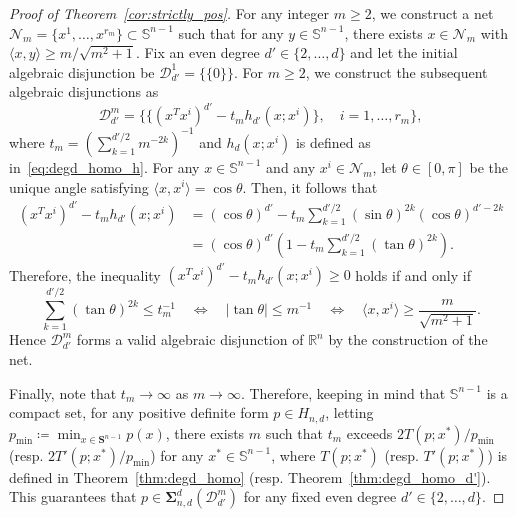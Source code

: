 \documentclass[12pt]{article}
\newcommand{\reals}{\mathbb{R}}
\newcommand{\DiSOS}{\mathbf{\Sigma}}
\newcommand{\defeq}{\coloneq}
\newcommand{\mcN}{\mathcal{N}}
\newcommand{\mbS}{\mathbb{S}}
\newcommand{\mcD}{\mathcal{D}}
\theoremstyle{remark}
\begin{document}
\begin{proof}[Proof of Theorem~\ref{cor:strictly_pos}]
For any integer $m\ge 2$, we
construct a net $\mcN_m=\{x^1,\ldots,x^{r_m}\}\subset\mbS^{n-1}$ such that for any $y\in \mbS^{n-1}$, there exists $x\in \mcN_m$ with $\langle x,y\rangle\ge m/\sqrt{m^2+1}$. 
Fix an even degree $d'\in\{2,\ldots,d\}$ and let the initial algebraic disjunction be $\mcD_{d'}^1=\{\{0\}\}$. For $m\ge 2$, we construct the subsequent algebraic disjunctions as 
\begin{equation}\label{eq:strictly_pos_ad}
 \mcD^{m}_{d'}=\big\{\{(x^Tx^i)^{d'}-t_mh_{d'}(x;x^i)\},\quad i=1,\ldots,r_m\big\},
\end{equation}
where $t_m=\left(\sum_{k=1}^{d'/2}m^{-2k}\right)^{-1}$ and $h_{d}(x;x^i)$ is defined as in~\eqref{eq:degd_homo_h}. 
For any $x\in\mbS^{n-1}$ and any $x^i\in\mcN_m$, let $\theta\in[0,\pi]$ be the unique angle satisfying $\langle x,x^i\rangle=\cos\theta$. Then, it follows that
\[\begin{aligned}
    (x^Tx^i)^{d'}-t_mh_{d'}(x;x^i)&=(\cos\theta)^{d'}-t_m\sum_{k=1}^{d'/2}(\sin\theta)^{2k}(\cos\theta)^{d'-2k}\\
    &=(\cos\theta)^{d'}\left(1-t_m\sum_{k=1}^{d'/2}(\tan\theta)^{2k}\right).
\end{aligned}\]
Therefore, the inequality $(x^Tx^i)^{d'}-t_mh_{d'}(x;x^i)\ge 0$ holds if and only if 
\[
  \sum_{k=1}^{d'/2}(\tan\theta)^{2k}\le t_m^{-1}
  \quad\Leftrightarrow\quad |\tan\theta|\le m^{-1} \quad
  \Leftrightarrow\quad\langle x,x^i\rangle\ge \frac{m}{\sqrt{m^2+1}}. 
\]
Hence $\mcD_{d'}^{m}$ forms a valid algebraic disjunction of $\reals^n$ by the construction of the net. 

Finally, note that $t_m\to\infty$ as $m\to\infty$. 
Therefore, keeping in mind that $\mbS^{n-1}$ is a compact set, for any positive definite form $p\in H_{n,d}$, letting $p_{\min}\defeq \min_{x\in\mathbf{S}^{n-1}}p(x)$,  
there exists $m$ such that $t_m$ exceeds $2T(p;x^*)/p_{\min}$ (resp. $2T'(p;x^*)/p_{\min}$) for any $x^*\in\mbS^{n-1}$, where $T(p;x^*)$ (resp. $T'(p;x^*)$) is defined in Theorem~\ref{thm:degd_homo} (resp. Theorem~\ref{thm:degd_homo_d'}). 
This guarantees that $p\in \DiSOS_{n,d}^{d}(\mcD_{d'}^{m})$ {for} any fixed even degree $d'\in\{2,\ldots,d\}$.
\end{proof}
\end{document}
